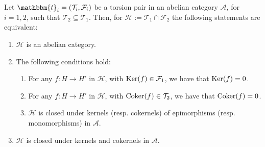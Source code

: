 \begin{thm}\label{thm_2_4}
  Let $\mathbbm{t}_i=(\mathcal{T}_i,\mathcal{F}_i)$ be a torsion pair in an abelian category
  $\mathscr{A}$, for $i=1,2$, such that $\mathcal{T}_2\subseteq \mathcal{T}_1$. Then, for
  $\mathcal{H}:=\mathcal{T}_1\cap\mathcal{F}_2$ the following statements are equivalent:
  \begin{enumerate}[label=(\alph*)]
    \item $\mathcal{H}$ is an abelian category.
    \item The following conditions hold:
      \begin{enumerate}[label=(\alph{enumi}\arabic*)]
        \item For any $f:H\to H'$ in $\mathcal{H}$, with $\operatorname{Ker}(f)\in\mathcal{F}_1$,
        we have that $\operatorname{Ker}(f)=0$.
        \item For any $f:H\to H'$ in $\mathcal{H}$, with $\operatorname{Coker}(f)\in\mathcal{T}_2$,
        we have that $\operatorname{Coker}(f)=0$.
        \item $\mathcal{H}$ is closed under kernels (resp. cokernels) of epimorphisms
        (resp. monomorphisms) in $\mathscr{A}$.
      \end{enumerate}
    \item $\mathcal{H}$ is closed under kernels and cokernels in $\mathscr{A}$.
  \end{enumerate}
\end{thm}

